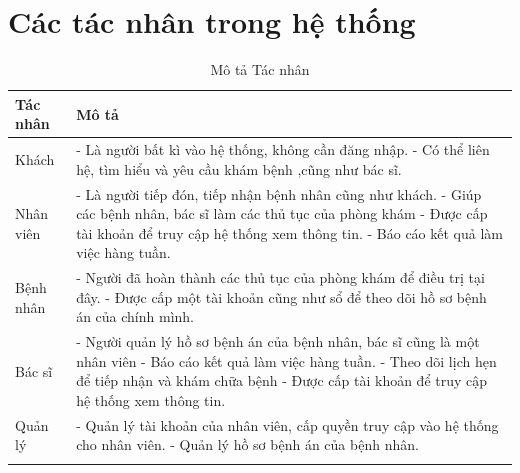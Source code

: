 \documentclass{report}
\begin{document}
\section{Các tác nhân trong hệ thống}
	\fontsize{13}{15}\selectfont
	\centering
	\begin{longtable}{|m{3cm}|m{14cm}|} 
		\hline
			\centering\textbf{Tác nhân} & \centerline{\textbf{Mô tả}}\\
		\hline
			\centering Khách & - Là người bất kì vào hệ thống, không cần đăng nhập.
			\newline - Có thể liên hệ, tìm hiểu và yêu cầu khám bệnh ,cũng như bác sĩ.\\ 
		\hline
			\centering Nhân viên  & - Là người tiếp đón, tiếp nhận bệnh nhân cũng như khách. 
			\newline - Giúp các bệnh nhân, bác sĩ làm các thủ tục của phòng khám
			\newline - Được cấp tài khoản để truy cập hệ thống xem thông tin.
			\newline - Báo cáo kết quả làm việc hàng tuần.\\ 
		\hline
			\centering Bệnh nhân  & - Người đã hoàn thành các thủ tục của phòng khám để điều trị tại đây.
			\newline - Được cấp một tài khoản cũng như sổ để theo dõi hồ sơ bệnh án của chính mình.\\ 
		\hline
			\centering Bác sĩ  & - Người quản lý hồ sơ bệnh án của bệnh nhân, bác sĩ cũng là một nhân viên
			\newline - Báo cáo kết quả làm việc hàng tuần.
			\newline - Theo dõi lịch hẹn để tiếp nhận và khám chữa bệnh
			\newline - Được cấp tài khoản để truy cập hệ thống xem thông tin.\\
		\hline
			\centering Quản lý  & - Quản lý tài khoản của nhân viên, cấp quyền truy cập vào hệ thống cho nhân viên.
			\newline - Quản lý hồ sơ bệnh án của bệnh nhân.\\
		\hline
		\caption{Mô tả Tác nhân}
	\end{longtable}
	

\raggedright
\end{document}
